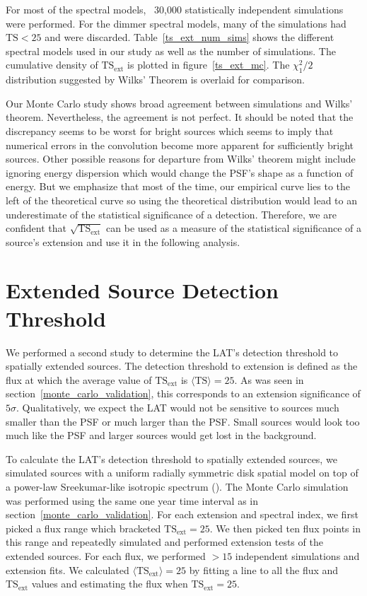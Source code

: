 \documentclass[12pt,preprint]{aastex}
\newcommand{\tsext}{{\ensuremath{\text{TS}_\text{ext}}}\xspace}
\newcommand{\ts}{\text{TS}\xspace}
\newcommand{\pointlike}{\text{\em pointlike}\xspace}
\begin{document}
For most of the spectral models, ~30,000 statistically independent
simulations were performed. For the dimmer spectral models, many of the
simulations had $\ts<25$ and were discarded.  Table~\ref{ts_ext_num_sims}
shows the different spectral models used in our study as well as the
number of simulations.  The cumulative density of \tsext is plotted in
figure~\ref{ts_ext_mc}. The $\chi^2_1/2$ distribution suggested by Wilks'
Theorem is overlaid for comparison.

Our Monte Carlo study shows broad agreement between simulations and Wilks'
theorem. Nevertheless, the agreement is not perfect.  It should be noted
that the discrepancy seems to be worst for bright sources which seems to
imply that numerical errors in the convolution become more apparent for
sufficiently bright sources.  Other possible reasons for departure from
Wilks' theorem might include \pointlike ignoring energy dispersion which
would change the PSF's shape as a function of energy. But we emphasize
that most of the time, our empirical curve lies to the left of the
theoretical curve so using the theoretical distribution would lead to an
underestimate of the statistical significance of a detection. Therefore,
we are confident that $\sqrt{\tsext}$ can be used as a measure of the
statistical significance of a source's extension and use it in the
following analysis.

\section{Extended Source Detection Threshold}\label{extension_sensitivity}

We performed a second study to determine the LAT's detection
threshold to spatially extended sources. The detection threshold
to extension is defined as the flux at which the average
value of $\tsext$ is $\langle\ts\rangle=25$. As was seen in
section~\ref{monte_carlo_validation}, this corresponds to an extension
significance of $5\sigma$.  Qualitatively, we expect the LAT would not
be sensitive to sources much smaller than the PSF or much larger than
the PSF.  Small sources would look too much like the PSF and larger
sources would get lost in the background.

To calculate the LAT's detection threshold to spatially extended
sources, we simulated sources with a uniform radially symmetric disk
spatial model on top of a power-law Sreekumar-like isotropic spectrum
(\cite{sreekumar_isotropic}).  The Monte Carlo simulation was performed
using the same one year time interval as in section~\ref{monte_carlo_validation}.
For each extension and spectral index, we
first picked a flux range which bracketed $\tsext=25$. We then picked
ten flux points in this range and repeatedly simulated and performed
extension tests of the extended sources.  For each flux, we performed
$>15$ independent simulations and extension fits.  We calculated
$\langle\tsext\rangle=25$ by fitting a line to all the flux and
$\tsext$ values and estimating the flux when $\tsext=25$.
\end{document}

